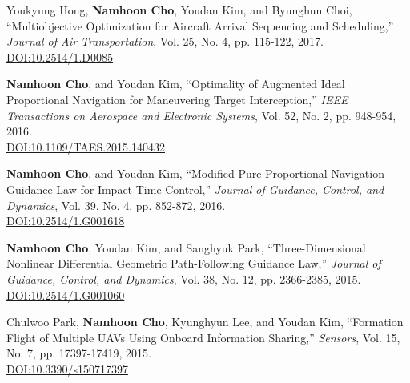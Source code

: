 \begin{enumerate}[itemsep=0.5em, label={[}J\arabic*{]}]
\item Youkyung Hong, \textbf{Namhoon Cho}, Youdan Kim, and Byunghun Choi, ``Multiobjective Optimization for Aircraft Arrival Sequencing and Scheduling,'' \textit{Journal of Air Transportation}, Vol. 25, No. 4, pp. 115-122, 2017. \\
 \href{https://doi.org/10.2514/1.D0085}{DOI:10.2514/1.D0085}

\item \textbf{Namhoon Cho}, and Youdan Kim, ``Optimality of Augmented Ideal Proportional Navigation for Maneuvering Target Interception,'' \textit{IEEE Transactions on Aerospace and Electronic Systems}, Vol. 52, No. 2, pp. 948-954, 2016. \\
 \href{https://doi.org/10.1109/TAES.2015.140432}{DOI:10.1109/TAES.2015.140432}

\item \textbf{Namhoon Cho}, and Youdan Kim, ``Modified Pure Proportional Navigation Guidance Law for Impact Time Control,'' \textit{Journal of Guidance, Control, and Dynamics}, Vol. 39, No. 4, pp. 852-872, 2016. \\
 \href{https://doi.org/10.2514/1.G001618}{DOI:10.2514/1.G001618}

\item \textbf{Namhoon Cho}, Youdan Kim, and Sanghyuk Park, ``Three-Dimensional Nonlinear Differential Geometric Path-Following Guidance Law,'' \textit{Journal of Guidance, Control, and Dynamics}, Vol. 38, No. 12, pp. 2366-2385, 2015. \\
 \href{https://doi.org/10.2514/1.G001060}{DOI:10.2514/1.G001060}

\item Chulwoo Park, \textbf{Namhoon Cho}, Kyunghyun Lee, and Youdan Kim, ``Formation Flight of Multiple UAVs Using Onboard Information Sharing,'' \textit{Sensors}, Vol. 15, No. 7, pp. 17397-17419, 2015. \\
 \href{https://doi.org/10.3390/s150717397}{DOI:10.3390/s150717397}

\end{enumerate}\vspace{0.5em}
